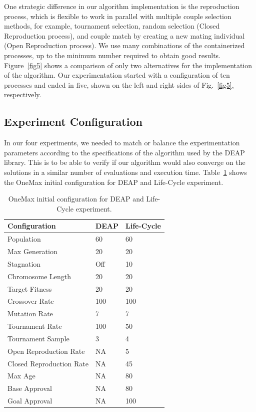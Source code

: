 \documentclass[runningheads]{llncs}
\begin{document}
One strategic difference in our algorithm implementation is the reproduction
process, which is flexible to work in parallel with multiple couple selection
methods, for example, tournament selection, random selection (Closed
Reproduction process), and couple match by creating a new mating individual
(Open Reproduction process). We use many combinations of the containerized
processes, up to the minimum number required to obtain good results.
Figure~\ref{fig5} shows a comparison of only two alternatives for the
implementation of the algorithm. Our experimentation started with a
configuration of ten processes and ended in five, shown on the left and right
sides of Fig.~\ref{fig5}, respectively.

\subsection{Experiment Configuration}

In our four experiments, we needed to match or balance the experimentation
parameters according to the specifications of the algorithm used by the DEAP
library. This is to be able to verify if our algorithm would also converge on
the solutions in a similar number of evaluations and execution time.
Table~\ref{tab1} shows the OneMax initial configuration for DEAP and Life-Cycle
experiment.

\begin{table}[]
    \centering        
    \caption{OneMax initial configuration for DEAP and Life-Cycle experiment.}\label{tab1}
    \begin{tabular}{|l|l|l|}
    \hline
    \textbf{Configuration} & \textbf{DEAP} & \textbf{Life-Cycle} \\ \hline
    Population & 60 & 60 \\ \hline
    Max Generation & 20 & 20 \\ \hline
    Stagnation & Off & 10 \\ \hline
    Chromosome Length & 20 & 20 \\ \hline
    Target Fitness & 20 & 20 \\ \hline
    Crossover Rate & 100 & 100 \\ \hline
    Mutation Rate & 7 & 7 \\ \hline
    Tournament Rate & 100 & 50 \\ \hline
    Tournament Sample & 3 & 4 \\ \hline
    Open Reproduction Rate & NA & 5 \\ \hline
    Closed Reproduction Rate & NA & 45 \\ \hline
    Max Age & NA & 80 \\ \hline
    Base Approval & NA & 80 \\ \hline
    Goal Approval & NA & 100 \\ \hline
    \end{tabular}
    \end{table}
\end{document}
